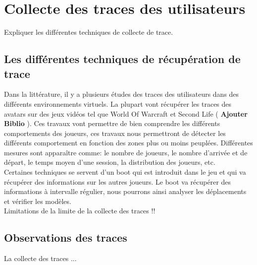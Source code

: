 \section{Collecte des traces des utilisateurs}
	Expliquer les différentes techniques de collecte de trace.
	\subsection{Les différentes techniques de récupération de trace}
	Dans la littérature, il y a plusieurs études des traces des utilisateurs dans des différents environnements virtuels. La plupart vont récupérer les traces des avatars sur des jeux vidéos tel que World Of Warcraft et Second Life ( \textbf{Ajouter Biblio} ). Ces travaux vont permettre de bien comprendre les différents comportements des joueurs, ces travaux nous permettront de détecter les différents comportement en fonction des zones plus ou moins peuplées. Différentes mesures sont apparaître comme: le nombre de joueurs, le nombre d'arrivée et de départ, le temps moyen d'une session, la distribution des joueurs, etc. \\
	Certaines techniques se servent d'un boot qui est introduit dans le jeu et qui va récupérer des informations sur les autres joueurs. Le boot va récupérer des informations à intervalle régulier, nous pourrons ainsi analyser les déplacements et vérifier les modèles.  \\
	Limitations de la limite de la collecte des traces !! \\
	

	\subsection{Observations des traces}
	La collecte des traces ...

